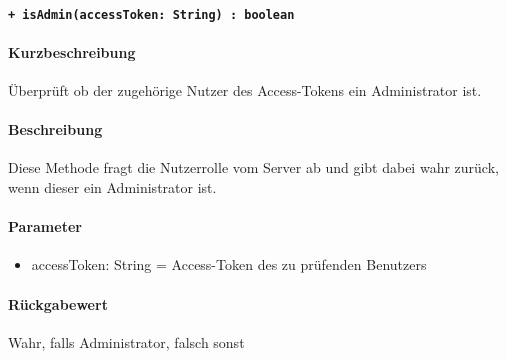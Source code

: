 \paragraph{\texttt{+ isAdmin(accessToken: String) : boolean}}%
\paragraph*{Kurzbeschreibung}
Überprüft ob der zugehörige Nutzer des Access-Tokens ein Administrator ist.
\paragraph*{Beschreibung}
Diese Methode fragt die Nutzerrolle vom Server ab und gibt dabei wahr zurück, wenn dieser ein Administrator ist.
\paragraph*{Parameter}
\begin{itemize}
    \item accessToken: String = Access-Token des zu prüfenden Benutzers
\end{itemize}
\paragraph*{Rückgabewert}
Wahr, falls Administrator, falsch sonst